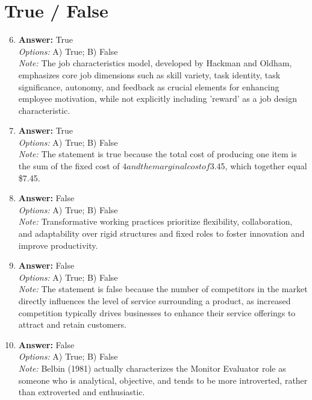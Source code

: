 \documentclass[12pt]{article}
\begin{document}
\section*{True / False}
\begin{enumerate}[label=\arabic*.]
\setcounter{enumi}{5}
\item \textbf{Answer:} True
\\ \textit{Options:} A) True; B) False
\\ \textit{Note:} The job characteristics model, developed by Hackman and Oldham, emphasizes core job dimensions such as skill variety, task identity, task significance, autonomy, and feedback as crucial elements for enhancing employee motivation, while not explicitly including 'reward' as a job design characteristic.
\item \textbf{Answer:} True
\\ \textit{Options:} A) True; B) False
\\ \textit{Note:} The statement is true because the total cost of producing one item is the sum of the fixed cost of $4 and the marginal cost of $3.45, which together equal \$7.45.
\item \textbf{Answer:} False
\\ \textit{Options:} A) True; B) False
\\ \textit{Note:} Transformative working practices prioritize flexibility, collaboration, and adaptability over rigid structures and fixed roles to foster innovation and improve productivity.
\item \textbf{Answer:} False
\\ \textit{Options:} A) True; B) False
\\ \textit{Note:} The statement is false because the number of competitors in the market directly influences the level of service surrounding a product, as increased competition typically drives businesses to enhance their service offerings to attract and retain customers.
\item \textbf{Answer:} False
\\ \textit{Options:} A) True; B) False
\\ \textit{Note:} Belbin (1981) actually characterizes the Monitor Evaluator role as someone who is analytical, objective, and tends to be more introverted, rather than extroverted and enthusiastic.
\end{enumerate}
\end{document}

